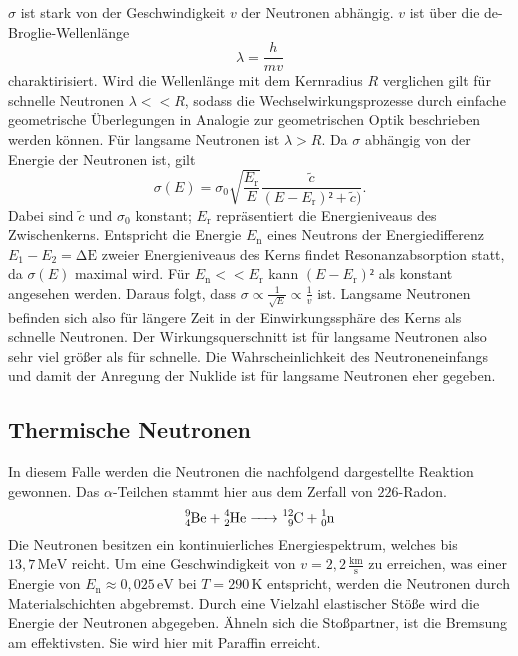 $\sigma$ ist stark von der Geschwindigkeit $v$ der Neutronen abhängig. $v$ ist über die de-Broglie-Wellenlänge
\begin{equation}
\lambda=\frac{h}{mv}
\label{eq:wellenlänge}
\end{equation}
charaktirisiert. Wird die Wellenlänge mit dem Kernradius $R$ verglichen gilt für schnelle Neutronen $\lambda<<R$, sodass die Wechselwirkungsprozesse durch einfache geometrische Überlegungen in Analogie zur geometrischen Optik beschrieben werden können. Für langsame Neutronen ist $\lambda>R$.
Da $\sigma$ abhängig von der Energie der Neutronen ist, gilt
\begin{equation}
\sigma(E)=\sigma_0\sqrt{\frac{E_\mathup{r}}{E}}\frac{\tilde{c}}{(E-E_\mathup{r})²+\tilde{c})}.
\label{eq:wirkungsquerschnitt_energie}
\end{equation}
Dabei sind $\tilde{c}$ und $\sigma_0$ konstant; $E_\mathup{r}$ repräsentiert die Energieniveaus des Zwischenkerns.
 Entspricht die Energie $E_\mathup{n}$ eines Neutrons der Energiedifferenz $E_\mathup{1}-E_2=\mathup{\Delta{E}}$ zweier Energieniveaus des Kerns findet Resonanzabsorption statt, da $\sigma(E)$ maximal wird. Für $E_\mathup{n}<<E_\mathup{r}$ kann $(E-E_\mathup{r})²$ als konstant angesehen werden. Daraus folgt, dass $\sigma\propto \frac{1}{\sqrt{E}}\propto\frac{1}{v}$ ist. Langsame Neutronen befinden sich also für längere Zeit in der Einwirkungssphäre des Kerns als schnelle Neutronen. Der Wirkungsquerschnitt ist für langsame Neutronen also sehr viel größer als für schnelle. Die Wahrscheinlichkeit des Neutroneneinfangs und damit der Anregung der Nuklide ist für langsame Neutronen eher gegeben.
\subsection{Thermische Neutronen}
In diesem Falle werden die Neutronen die nachfolgend dargestellte Reaktion gewonnen.  Das $\alpha$-Teilchen stammt hier aus dem Zerfall von $226$-Radon.
\begin{equation}
\ce{^9_4 Be + ^4_2 He -> ^12_9 C + ^1_0 n}
\end{equation}
Die Neutronen besitzen ein kontinuierliches Energiespektrum, welches bis $13,7\,\si\mega \mathup{e}\si\volt$ reicht. Um eine Geschwindigkeit von $v=2,2\,\frac{\si{\kilo\meter}}{\si\second}$ zu erreichen, was einer Energie von $E_\mathup{n}\approx 0,025\,\text{e}\si\volt$ bei $T=290\,\si\kelvin$ entspricht, werden die Neutronen durch Materialschichten abgebremst. 
Durch eine Vielzahl elastischer Stöße wird die Energie der Neutronen abgegeben. Ähneln sich die Stoßpartner, ist die Bremsung am effektivsten. Sie wird hier mit Paraffin erreicht. 
